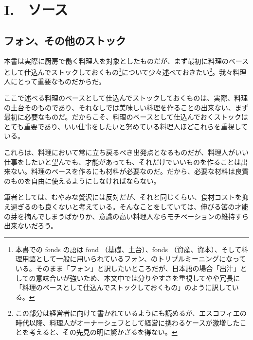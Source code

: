 \href{未、オスマゾームなどについての補足、カレームとの比較}{}
\href{未、原文対照チェック}{} \href{未、日本語表現校正}{}
\href{未、その他修正}{} \href{未、原稿最終校正}{}

\begin{Main}

\hypertarget{sauces}{%
\chapter{I.　ソース}\label{sauces}}


\hypertarget{les-fonds-de-cuisine}{%
\section{フォン、その他のストック}\label{les-fonds-de-cuisine}}


 

\normalsize
{}

本書は実際に厨房で働く料理人を対象としたものだが、まず最初に料理のベースとして仕込んでストックしておくもの\footnote{本書での
  fonds の語は fond （基礎、土台）、fonds
  （資産、資本）、そして料理用語として一般に用いられているフォン、のトリプルミーニングになっている。そのまま「フォン」と訳したいところだが、日本語の場合「出汁」としての意味合いが強いため、本文中では分りやすさを重視してやや冗長に「料理のベースとして仕込んでストックしておくもの」のように訳している。}について少々述べておきたい\footnote{この部分は経営者に向けて書かれているようにも読めるが、エスコフィエの時代以降、料理人がオーナーシェフとして経営に携わるケースが激増したことを考えると、その先見の明に驚かざるを得ない。}。我々料理人にとって重要なものだからだ。

ここで述べる料理のベースとして仕込んでストックしておくものは、実際、料理の土台そのものであり、それなしでは美味しい料理を作ることの出来ない、まず最初に必要なものだ。だからこそ、料理のベースとして仕込んでおくストックはとても重要であり、いい仕事をしたいと努めている料理人ほどこれらを重視している。

これらは、料理において常に立ち戻るべき出発点となるものだが、料理人がいい仕事をしたいと望んでも、才能があっても、それだけでいいものを作ることは出来ない。料理のベースを作るにも材料が必要なのだ。だから、必要な材料は良質のものを自由に使えるようにしなければならない。

筆者としては、むやみな贅沢には反対だが、それと同じくらい、食材コストを抑え過ぎるのも良くないと考えている。そんなことをしていては、伸びる筈の才能の芽を摘んでしまうばかりか、意識の高い料理人ならモチベーションの維持すら出来ないだろう。


\end{Main}
